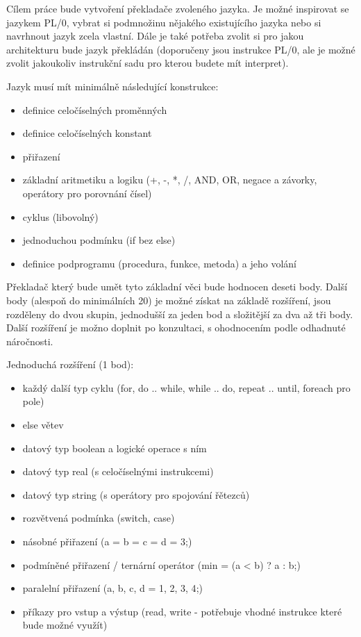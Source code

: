 \documentclass[
12pt,
a4paper,
pdftex,
czech,
titlepage
]{report}
\begin{document}
Cílem práce bude vytvoření překladače zvoleného jazyka. Je možné inspirovat se jazykem PL/0, vybrat si podmnožinu nějakého existujícího jazyka nebo si navrhnout jazyk zcela vlastní. Dále je také potřeba zvolit si pro jakou architekturu bude jazyk překládán (doporučeny jsou instrukce PL/0, ale je možné zvolit jakoukoliv instrukční sadu pro kterou budete mít interpret). 

Jazyk musí mít minimálně následující konstrukce:

\begin{itemize}
\item definice celočíselných proměnných
\item definice celočíselných konstant
\item přiřazení
\item základní aritmetiku a logiku (+, -, *, /, AND, OR, negace a závorky, operátory pro porovnání čísel)
\item cyklus (libovolný)
\item jednoduchou podmínku (if bez else)
\item definice podprogramu (procedura, funkce, metoda) a jeho volání
\end{itemize}

Překladač který bude umět tyto základní věci bude hodnocen deseti body. Další body (alespoň do minimálních 20) je možné získat na základě rozšíření, jsou rozděleny do dvou skupin, jednodušší za jeden bod a složitější za dva až tři body. Další rozšíření je možno doplnit po konzultaci, s ohodnocením podle odhadnuté náročnosti. 

Jednoduchá rozšíření (1 bod):

\begin{itemize}
\item každý další typ cyklu (for, do .. while, while .. do, repeat .. until, foreach pro pole)
\item else větev
\item datový typ boolean a logické operace s ním
\item datový typ real (s celočíselnými instrukcemi)
\item datový typ string (s operátory pro spojování řětezců)
\item rozvětvená podmínka (switch, case)
\item násobné přiřazení (a = b = c = d = 3;)
\item podmíněné přiřazení / ternární operátor (min = (a < b) ? a : b;)
\item paralelní přiřazení ({a, b, c, d} = {1, 2, 3, 4};)
\item příkazy pro vstup a výstup (read, write - potřebuje vhodné instrukce které bude možné využít)
\end{itemize}
\end{document}
